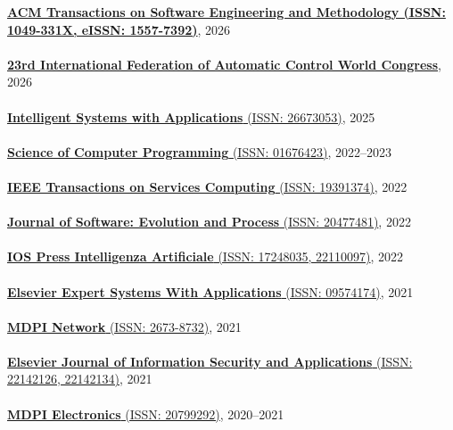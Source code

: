 \href{https://dl.acm.org/journal/tosem}{\textbf{ACM Transactions on Software Engineering and Methodology (ISSN: 1049-331X, eISSN: 1557-7392)}}, 2026
\\ \halfblankline \\
\href{https://ifac2026.org/}{\textbf{23rd International Federation of Automatic Control World Congress}}, 2026
\\ \halfblankline \\
\href{https://www.sciencedirect.com/journal/intelligent-systems-with-applications}{\textbf{Intelligent Systems with Applications} (ISSN: 26673053)}, 2025
\\ \halfblankline \\
\href{https://www.sciencedirect.com/journal/science-of-computer-programming}{\textbf{Science of Computer Programming} (ISSN: 01676423)}, 2022--2023
\\ \halfblankline \\
\href{https://www.computer.org/csdl/journal/sc}{\textbf{IEEE Transactions on Services Computing} (ISSN: 19391374)}, 2022
\\ \halfblankline \\
\href{https://onlinelibrary.wiley.com/journal/20477481}{\textbf{Journal of Software: Evolution and Process} (ISSN: 20477481)}, 2022
\\ \halfblankline \\
\href{https://www.iospress.com/catalog/journals/intelligenza-artificiale}{\textbf{IOS Press Intelligenza Artificiale} (ISSN: 17248035, 22110097)}, 2022
\\ \halfblankline \\
\href{https://www.journals.elsevier.com/expert-systems-with-applications}{\textbf{Elsevier Expert Systems With Applications} (ISSN: 09574174)}, 2021
\\ \halfblankline \\
\href{https://www.mdpi.com/journal/network}{\textbf{MDPI Network} (ISSN: 2673-8732)}, 2021
\\ \halfblankline \\
\href{https://www.journals.elsevier.com/journal-of-information-security-and-applications}{\textbf{Elsevier Journal of Information Security and Applications} (ISSN: 22142126, 22142134)}, 2021
\\ \halfblankline \\
\href{https://www.mdpi.com/journal/electronics}{\textbf{MDPI Electronics} (ISSN: 20799292)}, 2020--2021
\\ \halfblankline \\
